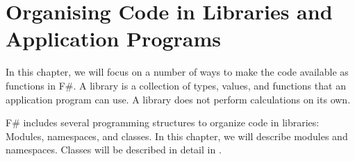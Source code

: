 \documentclass[fsharpNotes.tex]{subfiles}
\begin{document}
\chapter{Organising Code in Libraries and Application Programs}
\label{chap:modules}

In this chapter, we will focus on a number of ways to make the code available as  functions in F\#. A library is a collection of types, values, and functions that an application program can use. A library does not perform calculations on its own.

F\# includes several programming structures to organize code in libraries: Modules, namespaces, and classes. In this chapter, we will describe modules and namespaces. Classes will be described in detail in .
\end{document}
